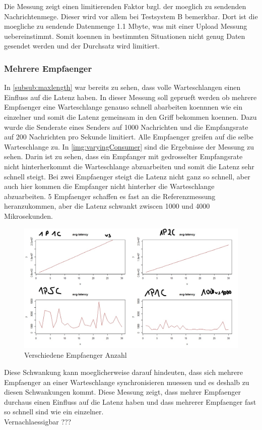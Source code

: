 Die Messung zeigt einen limitierenden Faktor bzgl. der moeglich zu sendenden Nachrichtenmege. Dieser wird vor allem bei Testsystem B bemerkbar. Dort ist die moegliche zu sendende Datenmenge 1.1 Mbyte, was mit einer Upload Messung uebereinstimmt. Somit koennen in bestimmten Situationen nicht genug Daten gesendet werden und der Durchsatz wird limitiert.

\subsubsection{Mehrere Empfaenger}
In \autoref{subsub:maxlength} war bereits zu sehen, dass volle Warteschlangen einen Einfluss auf die Latenz haben. In dieser Messung soll geprueft werden ob mehrere Empfaenger eine Warteschlange genauso schnell abarbeiten koennnen wie ein einzelner und somit die Latenz gemeinsam in den Griff bekommen koennen. Dazu wurde die Senderate eines Senders auf 1000 Nachrichten und die Empfangsrate auf 200 Nachrichten pro Sekunde limitiert. Alle Empfaenger greifen auf die selbe Warteschlange zu.
In \autoref{img:varyingConsumer} sind die Ergebnisse der Messung zu sehen. Darin ist zu sehen, dass ein Empfanger mit gedrosselter Empfangsrate nicht hinterherkommt die Warteschlange abzuarbeiten und somit die Latenz sehr schnell steigt. Bei zwei Empfaenger steigt die Latenz nicht ganz so schnell, aber auch hier kommen die Empfanger nicht hinterher die Warteschlange abzuarbeiten. 5 Empfaenger schaffen es fast an die Referenzmessung heranzukommen, aber die Latenz schwankt zwiscen 1000 und 4000 Mikrosekunden.
\begin{figure}
\center
  \includegraphics[width=1\textwidth]{images/varyingConsumer.jpg}
  \caption{Verschiedene Empfaenger Anzahl}
  \label{img:varyingConsumer}
\end{figure}
Diese Schwankung kann moeglicherweise darauf hindeuten, dass sich mehrere Empfaenger an einer Warteschlange synchronisieren muessen und es deshalb zu diesen Schwankungen kommt. Diese Messung zeigt, dass mehrer Empfaenger durchaus einen Einfluss auf die Latenz haben und dass mehrerer Empfaenger fast so schnell sind wie ein einzelner. \\
Vernachlaessigbar ???

